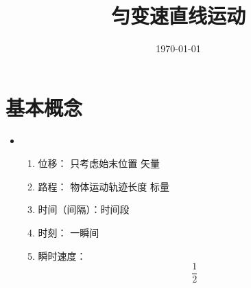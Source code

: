 \documentclass[11pt]{article}
\date{\today}
\title{匀变速直线运动}
\begin{document}
\maketitle
\tableofcontents

\section{基本概念}
\label{sec:org8080153}
\begin{itemize}
\item \begin{enumerate}
\item 位移： 只考虑始末位置 矢量
\item 路程： 物体运动轨迹长度 标量
\item 时间（间隔）：时间段
\item 时刻： 一瞬间
\item 瞬时速度： \begin{equation} \frac{1}{2} \end{equation}
\end{enumerate}
\end{itemize}
\end{document}
